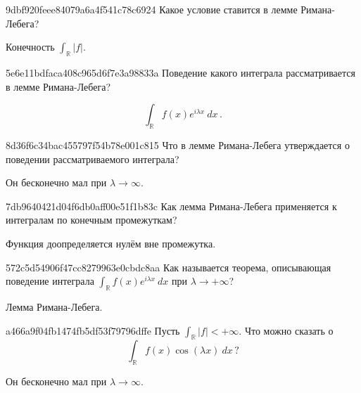 \begin{note}{9dbf920feee84079a6a4f541c78c6924}
    Какое условие ставится в лемме Римана-Лебега?

    \begin{cloze}{1}
        Конечность \({ \int_{\mathbb R} \left\lvert f \right\rvert }\).
    \end{cloze}
\end{note}

\begin{note}{5e6e11bdfaca408c965d6f7e3a98833a}
    Поведение какого интеграла рассматривается в лемме Римана-Лебега?

    \begin{cloze}{1}
        \[
            \int_{\mathbb R} f(x) e^{i \lambda x}\: dx\,.
        \]
    \end{cloze}
\end{note}

\begin{note}{8d36f6c34bac455797f54b78e001c815}
    Что в лемме Римана-Лебега утверждается о поведении рассматриваемого интеграла?

    \begin{cloze}{1}
        Он бесконечно мал при \({ \lambda \to \infty }\).
    \end{cloze}
\end{note}

\begin{note}{7db9640421d04f6db0aff00e51f1b83c}
    Как лемма Римана-Лебега применяется к интегралам по конечным промежуткам?

    \begin{cloze}{1}
        Функция доопределяется нулём вне промежутка.
    \end{cloze}
\end{note}

\begin{note}{572c5d54906f47cc8279963e0cbdc8aa}
    Как называется теорема, описывающая поведение интеграла \({ \int_{\mathbb R} f(x) e^{i \lambda x}\: dx }\) при \({ \lambda \to +\infty }\)?

    \begin{cloze}{1}
        Лемма Римана-Лебега.
    \end{cloze}
\end{note}

\begin{note}{a466a9f04fb1474fb5df53f79796dffe}
    Пусть \({ \int_{\mathbb R} \left\lvert f \right\rvert < +\infty }\).
    Что можно сказать о
    \[
        \int_{\mathbb R} f(x) \cos (\lambda x)\: dx\,?
    \]

    \begin{cloze}{1}
        Он бесконечно мал при \({ \lambda \to \infty }\).
    \end{cloze}
\end{note}

